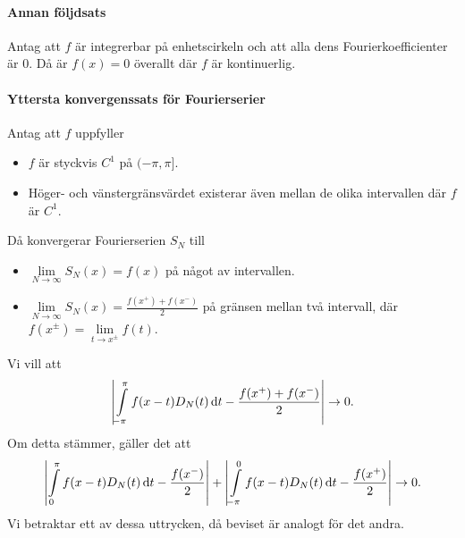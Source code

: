 \proof

\paragraph{Annan följdsats}
Antag att $f$ är integrerbar på enhetscirkeln och att alla dens Fourierkoefficienter är $0$. Då är $f(x) = 0$ överallt där $f$ är kontinuerlig.

\proof

\paragraph{Yttersta konvergenssats för Fourierserier}
Antag att $f$ uppfyller
\begin{itemize}
	\item $f$ är styckvis $C^{1}$ på $(-\pi, \pi]$.
	\item Höger- och vänstergränsvärdet existerar även mellan de olika intervallen där $f$ är $C^{1}$.
\end{itemize}
Då konvergerar Fourierserien $S_{N}$ till
\begin{itemize}
	\item $\lim\limits_{N\to\infty}S_{N}(x) = f(x)$ på något av intervallen.
	\item $\lim\limits_{N\to\infty}S_{N}(x) = \frac{f(x^{+}) + f(x^{-})}{2}$ på gränsen mellan två intervall, där $f(x^{\pm}) = \lim\limits_{t\to x^{\pm}}f(t)$.
\end{itemize}

\proof
Vi vill att
\begin{align*}
	\abs{\int\limits_{-\pi}^{\pi}f(x - t)D_{N}(t)\dd{t} - \frac{f(x^{+}) + f(x^{-})}{2}}\to 0.
\end{align*}
Om detta stämmer, gäller det att
\begin{align*}
	\abs{\int\limits_{0}^{\pi}f(x - t)D_{N}(t)\dd{t} - \frac{f(x^{-})}{2}} + \abs{\int\limits_{-\pi}^{0}f(x - t)D_{N}(t)\dd{t} - \frac{f(x^{+})}{2}} \to 0.
\end{align*}
Vi betraktar ett av dessa uttrycken, då beviset är analogt för det andra.

